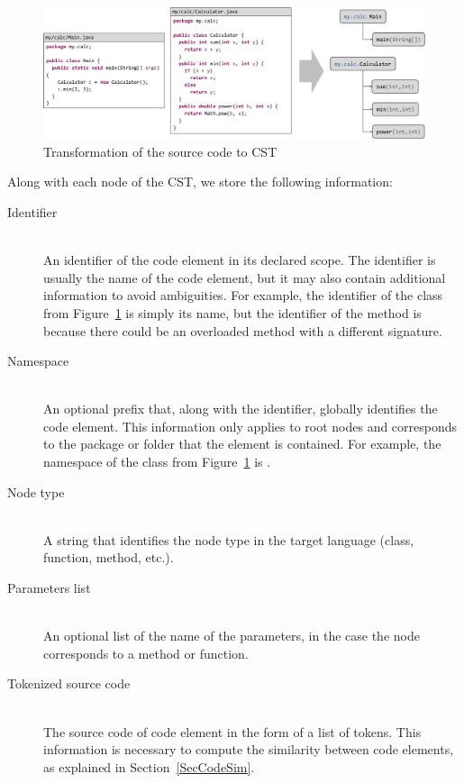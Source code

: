 \begin{figure}[htb]
\centering
\includegraphics[width=1.0\textwidth]{img/javaToCst.pdf}
\caption{Transformation of the source code to CST}
\label{FigJavaToCst}
\end{figure}

Along with each node of the CST, we store the following information:
\begin{description}
    \item[Identifier] \hfill \\
    An identifier of the code element in its declared scope. 
    The identifier is usually the name of the code element, but it may also contain additional information to avoid ambiguities.
    For example, the identifier of the class  from Figure~\ref{FigJavaToCst} is simply its name, but the identifier of the method  is  because there could be an overloaded method with a different signature.
    
    \item[Namespace] \hfill \\
    An optional prefix that, along with the identifier, globally identifies the code element. 
    This information only applies to root nodes and corresponds to the package or folder that the element is contained. For example, the namespace of the class  from Figure~\ref{FigJavaToCst} is .
    
    \item[Node type] \hfill \\
    A string that identifies the node type in the target language (class, function, method, etc.).
    
    \item[Parameters list]  \hfill \\
    An optional list of the name of the parameters, in the case the node corresponds to a method or function.
    
    \item[Tokenized source code]  \hfill \\
    The source code of code element in the form of a list of tokens. 
    This information is necessary to compute the similarity between code elements, as explained in Section~\ref{SecCodeSim}.
    
\end{description}

